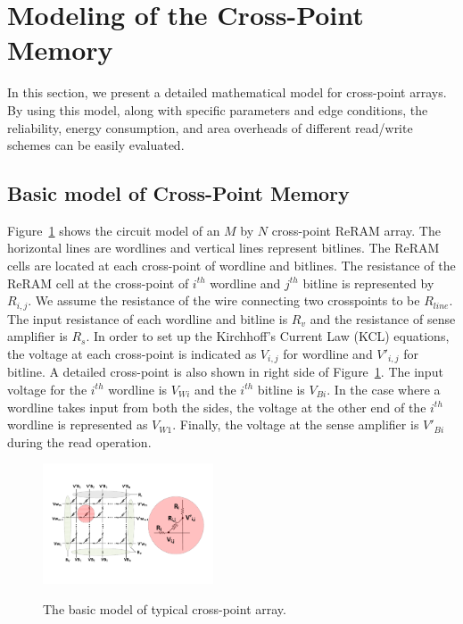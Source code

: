 \section{Modeling of the Cross-Point Memory}\label{sec:model}

In this section, we present a detailed mathematical model for cross-point arrays. By using this model, along with specific parameters and
edge conditions, the reliability, energy consumption, and area overheads of different read/write schemes can be easily evaluated.

\subsection{Basic model of Cross-Point Memory}
Figure~\ref{fig:modeling} shows the circuit model of an $M$ by $N$ cross-point ReRAM array. The horizontal lines are wordlines and vertical lines represent bitlines. The ReRAM cells are located at each cross-point of wordline and bitlines. The resistance of the ReRAM cell at the cross-point of $i^{th}$ wordline and $j^{th}$ bitline is represented by $R_{i,j}$. We assume the resistance of the wire connecting two crosspoints to be $R_{line}$. The input resistance of each wordline and bitline is $R_v$ and the resistance of sense amplifier is $R_s$. In order to set up the Kirchhoff's Current Law (KCL) equations, the voltage at each cross-point is indicated as $V_{i,j}$ for wordline and $V'_{i,j}$ for bitline. A detailed cross-point is also shown in right side of Figure~\ref{fig:modeling}. The input voltage for the $i^{th}$ wordline is $V_{Wi}$ and the $i^{th}$ bitline is $V_{Bi}$. In the case where a wordline takes input from both the sides, the voltage at the other end of the $i^{th}$ wordline is represented as $V_{W1}$. Finally, the voltage at the sense amplifier is $V'_{Bi}$ during the read operation.

\begin{figure}%
\centering
  \includegraphics[width=0.45\textwidth]{./figures/model_reverse.pdf}\\
  \caption{The basic model of typical cross-point array.}\label{fig:modeling}
  \vspace{-12pt}
\end{figure}

